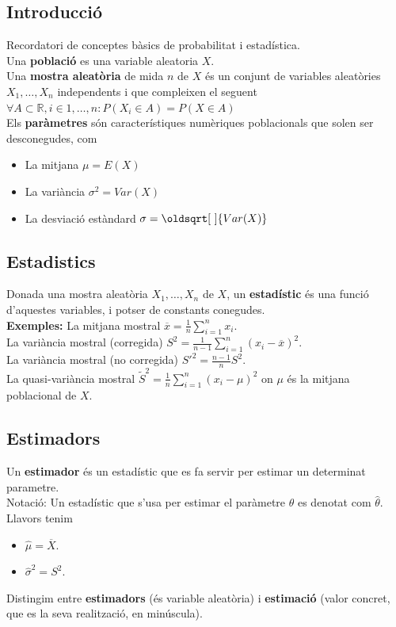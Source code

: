 \documentclass[a4paper]{sciposter}
\renewcommand*{\sqrt}[2][\ ]{\oldsqrt[#1]{#2} }
\begin{document}
\selectfont

\begin{multicols}{3}
\section{Introducció}
Recordatori de conceptes bàsics de probabilitat i estadística.\\
Una \textbf{població} es una variable aleatoria $X$.\\
Una \textbf{mostra aleatòria} de mida $n$ de $X$ és un conjunt de variables aleatòries $X_1,\dots,X_n$ independents i que compleixen el seguent $\forall A\subset\mathbb{R}, i \in 1,\dots,n:P(X_i \in A) = P(X\in A)$\\
Els \textbf{paràmetres} són característiques numèriques poblacionals que solen ser desconegudes, com
\begin{itemize}
	\item La mitjana $\mu = E(X)$
	\item La variància $\sigma^2 = Var(X)$
	\item La desviació estàndard $\sigma = \sqrt{Var(X)}$
\end{itemize}
\subsection{Estadistics}
Donada una mostra aleatòria $X_1,\dots,X_n$ de $X$, un \textbf{estadístic} és una funció d'aquestes variables, i potser de constants conegudes.\\
\textbf{Exemples:}
La mitjana mostral $\overline{x} = \frac{1}{n} \sum\limits_{i=1}^{n} x_i$.\\
La variància mostral (corregida) $S^2 = \frac{1}{n-1} \sum\limits_{i=1}^{n} (x_i - \overline{x})^2$.\\
La variància mostral (no corregida) $S'^2 = \frac{n-1}{n}S^2$.\\
La quasi-variància mostral $\tilde{S}^2 = \frac{1}{n} \sum\limits_{i=1}^{n} (x_i - \mu)^2$ on $\mu$ és la mitjana poblacional de $X$.
\subsection{Estimadors}
Un \textbf{estimador} és un estadístic que es fa servir per estimar un determinat parametre.\\
Notació: Un estadístic que s'usa per estimar el paràmetre $\theta$ es denotat com $\hat{\theta}$. Llavors tenim
\begin{itemize}
	\item $\hat{\mu} = \overline{X}$.
	\item $\hat{\sigma}^2 = S^2$.
\end{itemize}
Distingim entre \textbf{estimadors} (és variable aleatòria) i \textbf{estimació} (valor concret, que es la seva realització, en minúscula).

\end{multicols}
\end{document}
